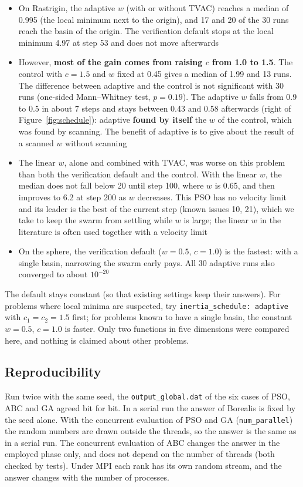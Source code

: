 \documentclass[11pt,a4paper]{article}
\begin{document}
\begin{itemize}
\item On Rastrigin, the adaptive $w$ (with or without TVAC) reaches a median of 0.995 (the local minimum next to the origin), and 17 and 20 of the 30 runs reach the basin of the origin. The verification default stops at the local minimum 4.97 at step 53 and does not move afterwards
\item However, \textbf{most of the gain comes from raising $c$ from 1.0 to 1.5}. The control with $c = 1.5$ and $w$ fixed at 0.45 gives a median of 1.99 and 13 runs. The difference between adaptive and the control is not significant with 30 runs (one-sided Mann--Whitney test, $p = 0.19$). The adaptive $w$ falls from 0.9 to 0.5 in about 7 steps and stays between 0.43 and 0.58 afterwards (right of Figure~\ref{fig:schedule}): adaptive \textbf{found by itself} the $w$ of the control, which was found by scanning. The benefit of adaptive is to give about the result of a scanned $w$ without scanning
\item The linear $w$, alone and combined with TVAC, was worse on this problem than both the verification default and the control. With the linear $w$, the median does not fall below 20 until step 100, where $w$ is 0.65, and then improves to 6.2 at step 200 as $w$ decreases. This PSO has no velocity limit and its leader is the best of the current step (known issues 10, 21), which we take to keep the swarm from settling while $w$ is large; the linear $w$ in the literature is often used together with a velocity limit
\item On the sphere, the verification default ($w = 0.5$, $c = 1.0$) is the fastest: with a single basin, narrowing the swarm early pays. All 30 adaptive runs also converged to about $10^{-20}$
\end{itemize}

The default stays constant (so that existing settings keep their answers). For problems where local minima are suspected, try \texttt{inertia\_schedule: adaptive} with $c_1 = c_2 = 1.5$ first; for problems known to have a single basin, the constant $w = 0.5$, $c = 1.0$ is faster. Only two functions in five dimensions were compared here, and nothing is claimed about other problems.

\subsection{Reproducibility}

Run twice with the same seed, the \texttt{output\_global.dat} of the six cases of PSO, ABC and GA agreed bit for bit. In a serial run the answer of Borealis is fixed by the seed alone. With the concurrent evaluation of PSO and GA (\texttt{num\_parallel}) the random numbers are drawn outside the threads, so the answer is the same as in a serial run. The concurrent evaluation of ABC changes the answer in the employed phase only, and does not depend on the number of threads (both checked by tests). Under MPI each rank has its own random stream, and the answer changes with the number of processes.
\end{document}
